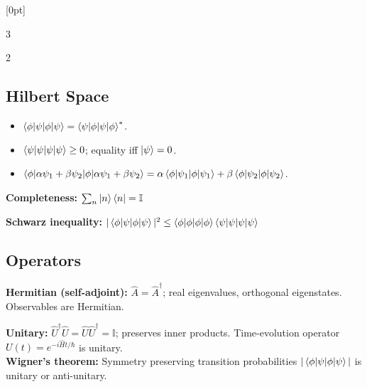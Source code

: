 \documentclass[9pt,a4paper]{article} %
\newcommand{\Hhat}{\hat{H}}
\newcommand{\Id}{\mathbb{I}}
\begin{document}
\begingroup
\setcounter{tocdepth}{1}%
\scriptsize
\setlength{\parskip}{0pt}%
\setlength{\parindent}{0pt}%
\setlength{\columnsep}{0.4cm}%
\contentsmargin{0pt}%
[0pt]{}%
  {\bfseries}{\bfseries}%
  {\,\dotfill\,\thecontentspage}%
\begin{multicols}{3}
\makeatletter{}\makeatother
\end{multicols}%
\vspace{2pt}%
\endgroup
\setcounter{tocdepth}{2}%

\begin{multicols}{2}
\raggedcolumns




\subsection{Hilbert Space}
\begin{itemize}\itemsep0em
   \item $\braket{\phi|\psi}=\braket{\psi|\phi}^{*}$.
   \item $\braket{\psi|\psi}\ge 0$; equality iff $\ket{\psi}=0$.
   \item $\braket{\phi|\alpha\psi_1+\beta\psi_2}=\alpha\braket{\phi|\psi_1}+\beta\braket{\phi|\psi_2}$.
\end{itemize}
\textbf{Completeness:} $\sum_{n}\ket{n}\bra{n}=\Id$

\textbf{Schwarz inequality:} $|\braket{\phi|\psi}|^2\le\braket{\phi|\phi}\braket{\psi|\psi}$

\subsection{Operators}
    \textbf{Hermitian (self-adjoint):} $\hat{A}=\hat{A}^\dagger$; real eigenvalues, orthogonal eigenstates.  Observables are Hermitian.

    \textbf{Unitary:} $\hat{U}^\dagger\hat{U}=\hat{U}\hat{U}^\dagger=\Id$; preserves inner products.  Time-evolution operator $U(t)=e^{-i\Hhat t/\hbar}$ is unitary.\\
    \textbf{Wigner's theorem:} Symmetry preserving transition probabilities $|\braket{\phi|\psi}|$ is unitary or anti-unitary.


\end{multicols}
\end{document}
